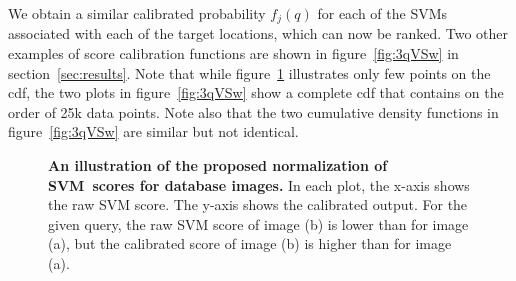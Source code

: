       We obtain a similar calibrated probability $f_j(q)$ for each of the SVMs associated with each of the target locations, which can now be ranked.
      Two other examples of score calibration functions are shown in figure~\ref{fig:3qVSw} in section~\ref{sec:results}. Note that while figure~\ref{fig:calib} illustrates only few points on the cdf, the two plots in figure~\ref{fig:3qVSw} show a complete cdf that contains on the order of 25k data points. Note also that the two cumulative density functions in figure~\ref{fig:3qVSw} are similar but not identical.
      \begin{figure}[]
         \vspace{1mm}
         \vspace{1.5mm}\newline
         \vspace*{-3mm}
         \caption[]{
            \textbf{An illustration of the proposed normalization of SVM~scores for database images.}
            In each plot, the x-axis shows the raw SVM score. The y-axis shows the calibrated output. For the given query, the raw SVM score of image (b) is lower than for image (a), but the calibrated score of image (b) is higher than for image (a). 
         }
         \vspace*{-2mm}
         \label{fig:calib}
      \end{figure}
